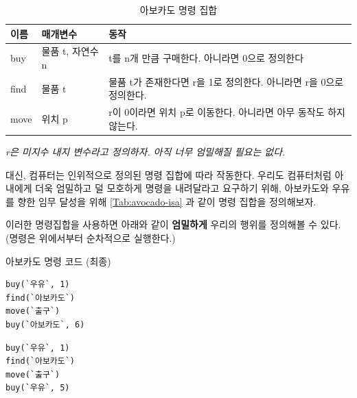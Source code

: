 \documentclass[a4paper,12pt]{book}
\begin{document}
\begin{table}[!h]
    \centering

    \caption{아보카도 명령 집합}
    \label{Tab:avocado-isa}

    \begin{tabular}{ || m{2em} | m{3.8em} | m{22em} || }
        \hline
        이름 & 매개변수 & 동작 \\
        \hline\hline
        buy & 물품 t, 자연수 n & t를 n개 만큼 구매한다. 아니라면 0으로 정의한다 \\
        \hline
        find & 물품 t & 물품 t가 존재한다면 r을 1로 정의한다. 아니라면 r을 0으로 정의한다. \\
        \hline
        move & 위치 p & r이 0이라면 위치 p로 이동한다. 아니라면 아무 동작도 하지 않는다. \\
        \hline
    \end{tabular}
    \newline
    \textit{\color{gray} \small r은 미지수 내지 변수라고 정의하자.
    아직 너무 엄밀해질 필요는 없다.}
\end{table}

대신, 컴퓨터는 인위적으로 정의된 명령 집합에 따라 작동한다.
우리도 컴퓨터처럼 아내에게 더욱 엄밀하고 덜 모호하게 명령을 내려달라고 요구하기 위해,
아보카도와 우유를 향한 임무 달성을 위해 \autoref{Tab:avocado-isa} 과 같이 명령
집합을 정의해보자.

이러한 명령집합을 사용하면 아래와 같이 \textbf{엄밀하게} 우리의 행위를
정의해볼 수 있다. (명령은 위에서부터 순차적으로 실행한다.)

\begin{center}

    \centering

    아보카도 명령 코드 (최종)

    \begin{minipage}{0.45\textwidth}
        \begin{lstlisting}[escapeinside=``]
buy(`우유`, 1)
find(`아보카도`)
move(`출구`)
buy(`아보카도`, 6)
        \end{lstlisting}
    \end{minipage}
    \hfill
    \begin{minipage}{0.45\textwidth}
        \begin{lstlisting}[escapeinside=``]
buy(`우유`, 1)
find(`아보카도`)
move(`출구`)
buy(`우유`, 5)
        \end{lstlisting}
    \end{minipage}

\end{center}
\end{document}
